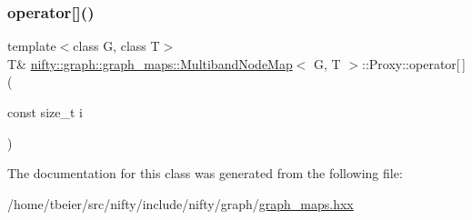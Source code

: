 \mbox{\label{classnifty_1_1graph_1_1graph__maps_1_1MultibandNodeMap_1_1Proxy_a8786949cbdef794607129337c0aeff3e}} 
\subsubsection{\texorpdfstring{operator[]()}{operator[]()}\hspace{0.1cm}{\footnotesize\ttfamily [2/2]}}
{\footnotesize\ttfamily template$<$class G, class T$>$ \\
T\& \hyperlink{structnifty_1_1graph_1_1graph__maps_1_1MultibandNodeMap}{nifty\+::graph\+::graph\+\_\+maps\+::\+Multiband\+Node\+Map}$<$ G, T $>$\+::Proxy\+::operator\mbox{[}$\,$\mbox{]} (\begin{DoxyParamCaption}\item[{const size\+\_\+t}]{i }\end{DoxyParamCaption})\hspace{0.3cm}{\ttfamily [inline]}}



The documentation for this class was generated from the following file\+:\begin{DoxyCompactItemize}
\item 
/home/tbeier/src/nifty/include/nifty/graph/\hyperlink{graph__maps_8hxx}{graph\+\_\+maps.\+hxx}\end{DoxyCompactItemize}
